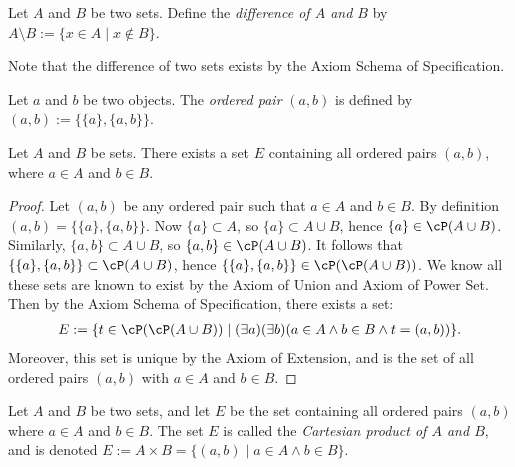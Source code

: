     \begin{definition}
        Let $A$ and $B$ be two sets. Define the \textit{difference of $A$ and $B$} by $A \setminus B := \{x \in A \mid x \not\in B\}$.
    \end{definition}

    Note that the difference of two sets exists by the Axiom Schema of Specification.

    \begin{definition}
        Let $a$ and $b$ be two objects. The \textit{ordered pair} $(a,b)$ is defined by $(a,b) := \{\{a\},\{a,b\}\}$.
    \end{definition}

    \begin{proposition}
        Let $A$ and $B$ be sets. There exists a set $E$ containing all ordered pairs $(a,b)$, where $a \in A$ and $b \in B$.
    \end{proposition}
        \begin{proof}
            Let $(a,b)$ be any ordered pair such that $a \in A$ and $b \in B$. By definition $(a,b) = \{\{a\},\{a,b\}\}$. Now $\{a\} \subset A$, so $\{a\} \subset A \cup B$, hence $\{a\} \in \cP(A \cup B)$. Similarly, $\{a,b\} \subset A \cup B$, so $\{a,b\} \in \cP(A \cup B)$. It follows that $\{\{a\},\{a,b\}\} \subset \cP(A \cup B)$, hence $\{\{a\},\{a,b\}\} \in \cP(\cP(A \cup B))$. We know all these sets are known to exist by the Axiom of Union and Axiom of Power Set. Then by the Axiom Schema of Specification, there exists a set:
                \begin{equation*}
                \begin{split}
                    E := \{t \in \cP(\cP(A \cup B)) \mid (\exists a)(\exists b)(a \in A \land b \in B \land t = (a,b))\}.
                \end{split}
                \end{equation*}
            Moreover, this set is unique by the Axiom of Extension, and is the set of all ordered pairs $(a,b)$ with $a \in A$ and $b \in B$.
        \end{proof}

    \begin{definition}
        Let $A$ and $B$ be two sets, and let $E$ be the set containing all ordered pairs $(a,b)$ where $a \in A$ and $b \in B$. The set $E$ is called the \textit{Cartesian product of $A$ and $B$}, and is denoted $E:= A \times B = \{(a,b) \mid a \in A \land b \in B\}$.
    \end{definition}

